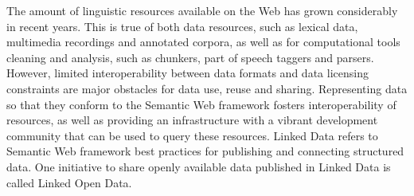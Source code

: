 %
%



The amount of linguistic resources available on the Web has grown considerably in recent years. This is true of both data resources, such as lexical data, multimedia recordings and annotated corpora, as well as for computational tools cleaning and analysis, such as chunkers, part of speech taggers and parsers. However, limited interoperability between data formats and data licensing constraints are major obstacles for data use, reuse and sharing. Representing data so that they conform to the Semantic Web framework fosters interoperability of resources, as well as providing an infrastructure with a vibrant development community that can be used to query these resources. Linked Data refers to Semantic Web framework best practices for publishing and connecting structured data. One initiative to share openly available data published in Linked Data is called Linked Open Data.


